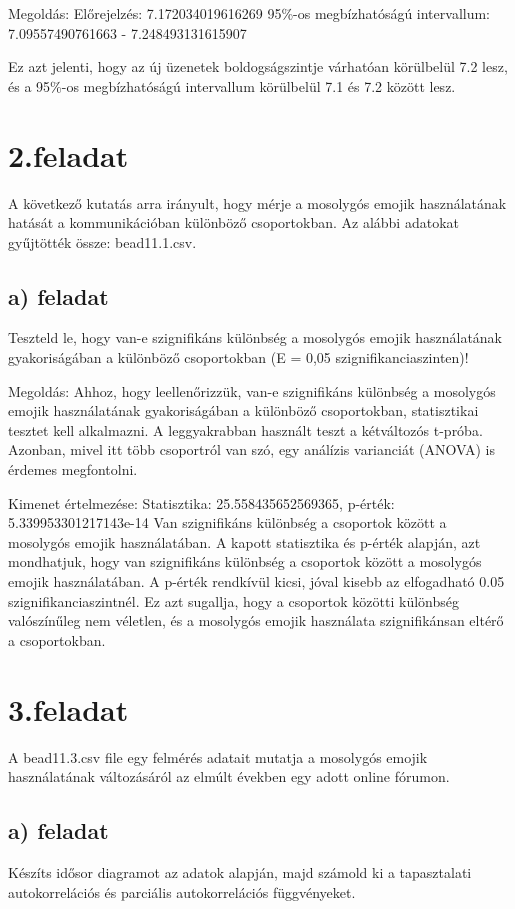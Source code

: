 \documentclass[11pt,a4paper,oneside]{report}
\begin{document}
Megoldás:
Előrejelzés: 7.172034019616269
95\%-os megbízhatóságú intervallum: 7.09557490761663 - 7.248493131615907

Ez azt jelenti, hogy az új üzenetek boldogságszintje várhatóan körülbelül 7.2 lesz,
és a 95\%-os megbízhatóságú intervallum körülbelül 7.1 és 7.2 között lesz.



\chapter{2.feladat}
A következő kutatás arra irányult, hogy mérje a mosolygós emojik használatának hatását a kommunikációban különböző csoportokban. Az alábbi adatokat gyűjtötték  össze: bead11.1.csv.

\section{a) feladat}
Teszteld le, hogy van-e szignifikáns különbség a mosolygós emojik használatának gyakoriságában a különböző csoportokban (E = 0,05 szignifikanciaszinten)!

Megoldás:
Ahhoz, hogy leellenőrizzük, van-e szignifikáns különbség a mosolygós emojik használatának gyakoriságában a különböző csoportokban, statisztikai tesztet kell alkalmazni.
A leggyakrabban használt teszt a kétváltozós t-próba. Azonban, mivel itt több csoportról van szó, egy análízis varianciát (ANOVA) is érdemes megfontolni.

Kimenet értelmezése:
Statisztika: 25.558435652569365, p-érték: 5.339953301217143e-14
Van szignifikáns különbség a csoportok között a mosolygós emojik használatában.
A kapott statisztika és p-érték alapján, azt mondhatjuk, hogy van szignifikáns különbség a csoportok között a mosolygós emojik használatában. A p-érték rendkívül kicsi, jóval kisebb az elfogadható 0.05 szignifikanciaszintnél. Ez azt sugallja, hogy a csoportok közötti különbség valószínűleg nem véletlen, és a mosolygós emojik használata szignifikánsan eltérő a csoportokban.

\chapter{3.feladat}
A bead11.3.csv file egy felmérés adatait mutatja a mosolygós emojik használatának változásáról az elmúlt években egy adott online fórumon.

\section{a) feladat}
Készíts idősor diagramot az adatok alapján, majd számold ki a tapasztalati autokorrelációs és parciális autokorrelációs függvényeket.
\end{document}
